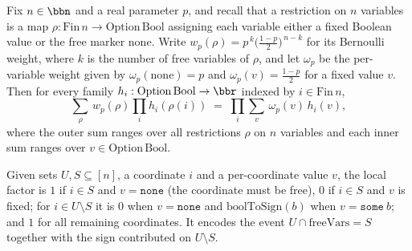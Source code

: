 \begin{lemma}
\label{RestrictionFourier.sum_bernoulli_prod}
\leanok
{}
Fix $n \in \bbn$ and a real parameter $p$, and recall that a restriction on $n$
variables is a map $\rho : \mathrm{Fin}\,n \to \mathrm{Option}\,\mathrm{Bool}$ assigning
each variable either a fixed Boolean value or the free marker $\mathrm{none}$. Write
$w_p(\rho) = p^{\,k}\bigl(\tfrac{1-p}{2}\bigr)^{\,n-k}$ for its Bernoulli weight, where
$k$ is the number of free variables of $\rho$, and let $\omega_p$ be the per-variable
weight given by $\omega_p(\mathrm{none}) = p$ and $\omega_p(v) = \tfrac{1-p}{2}$ for a
fixed value $v$. Then for every family $h_i : \mathrm{Option}\,\mathrm{Bool} \to \bbr$
indexed by $i \in \mathrm{Fin}\,n$,
\[
  \sum_{\rho}\, w_p(\rho) \prod_{i} h_i(\rho(i))
  \;=\; \prod_{i} \sum_{v}\, \omega_p(v)\, h_i(v),
\]
where the outer sum ranges over all restrictions $\rho$ on $n$ variables and each inner
sum ranges over $v \in \mathrm{Option}\,\mathrm{Bool}$.
\end{lemma}

\begin{definition}
\label{RestrictionFourier.localFactor}
\leanok
{}
Given sets $U, S \subseteq [n]$, a coordinate $i$ and a per-coordinate value $v$, the
local factor is $1$ if $i \in S$ and $v = \mathtt{none}$ (the coordinate must be free),
$0$ if $i \in S$ and $v$ is fixed; for $i \in U \setminus S$ it is $0$ when $v =
\mathtt{none}$ and $\mathrm{boolToSign}(b)$ when $v = \mathtt{some}\ b$; and $1$ for all
remaining coordinates. It encodes the event $U \cap \mathrm{freeVars} = S$ together with
the sign contributed on $U \setminus S$.
\end{definition}


